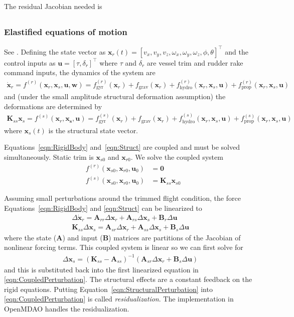 \documentclass[10pt]{article}
\newcommand{\mbf}[1]{\mathbf{#1}}
\newcommand{\be}{\begin{eqnarray}}
\newcommand{\ee}{\end{eqnarray}}
\newcommand{\beq}{\begin{equation}\begin{aligned}}
\newcommand{\eeq}{\end{aligned}\end{equation}}
\newcommand{\tn}[1]{\textrm{#1}}
\begin{document}
The residual Jacobian needed is
\be
\ee

\subsubsection{Elastified equations of motion}
See \citet[Sec. 5.3.2]{Palacios2023a}.
Defining the state vector as $\mbf{x}_r(t) = [v_x, v_y, v_z, \omega_x, \omega_y, \omega_z, \phi, \theta]^{\top}$ and the control inputs as $\mbf{u} = [\tau, \delta_r]^{\top}$ where $\tau$ and $\delta_r$ are vessel trim and rudder rake command inputs, the dynamics of the system are
\be
\label{eqn:RigidBody}
\dot{\mbf{x}}_r = f^{(r)}(\mbf{x}_r, \mbf{x}_s, \mbf{u}, \mbf{w})
=
f_{\tn{gyr}}^{(r)}\left(\mbf{x}_r\right) + f_{\tn{grav}} \left(\mbf{x}_r\right)
+ f_{\tn{hydro}}^{(r)}\left(\mbf{x}_r, \mbf{x}_s, \mbf{u}\right)
+ f_{\tn{prop}}^{(r)}\left(\mbf{x}_r, \mbf{x}_s, \mbf{u}\right)
\ee
and (under the small amplitude structural deformation assumption) the deformations are determined by
\be
\label{eqn:Struct}
\mbf{K}_{ss} \mbf{x}_s = f^{(s)}\left(\mbf{x}_r, \mbf{x_s}, \mbf{u}\right)
=
f_{\tn{gyr}}^{(s)}\left(\mbf{x}_r\right) + f_{\tn{grav}}\left(\mbf{x}_r\right)
+ f_{\tn{hydro}}^{(s)}\left(\mbf{x}_r, \mbf{x}_s, \mbf{u}\right)
+ f_{\tn{prop}}^{(s)}\left(\mbf{x}_r, \mbf{x}_s, \mbf{u}\right)
\ee
where $\mbf{x}_s(t)$ is the structural state vector.

Equations~\eqref{eqn:RigidBody} and~\eqref{eqn:Struct} are coupled and must be solved simultaneously.
Static trim is $\mbf{x}_{s0}$ and $\mbf{x}_{r0}$.
We solve the coupled system
\beq
& f^{(r)}\left( \mbf{x}_{s0}, \mbf{x}_{r0}, \mbf{u}_{0} \right) & = \mbf{0}
\\
& f^{(s)}\left( \mbf{x}_{s0}, \mbf{x}_{r0}, \mbf{u}_{0} \right)
&=
\mbf{K}_{ss} \mbf{x}_{s0}
\eeq

Assuming small perturbations around the trimmed flight condition, the force Equations~\eqref{eqn:RigidBody} and \eqref{eqn:Struct} can be linearized to
% 
\beq
\label{eqn:CoupledPerturbation}
\Delta \dot{\mbf{x}}_r = \mbf{A}_{rr} \Delta \mbf{x}_r
+ \mbf{A}_{rs} \Delta \mbf{x}_s
+ \mbf{B}_{r} \Delta \mbf{u}
\\
\mbf{K}_{ss} \Delta {\mbf{x}}_s =
\mbf{A}_{sr} \Delta \mbf{x}_r
+ \mbf{A}_{ss} \Delta \mbf{x}_s
+ \mbf{B}_{s} \Delta \mbf{u}
\eeq
% 
where the state ($\mbf{A}$) and input ($\mbf{B}$) matrices are partitions of the Jacobian of nonlinear forcing terms.
This coupled system is linear so we can first solve for
\be
\label{eqn:StructuralPerturbation}
\Delta \mbf{x}_s = \left(\mbf{K}_{ss} - \mbf{A}_{ss}\right)^{-1} \left(\mbf{A}_{sr} \Delta \mbf{x}_r + \mbf{B}_s \Delta \mbf{u} \right)
\ee
and this is substituted back into the first linearized equation in \eqref{eqn:CoupledPerturbation}.
The structural effects are a constant feedback on the rigid equations.
Putting Equation~\eqref{eqn:StructuralPerturbation} into \eqref{eqn:CoupledPerturbation} is called \emph{residualization}.
The implementation in OpenMDAO handles the residualization.
\end{document}
